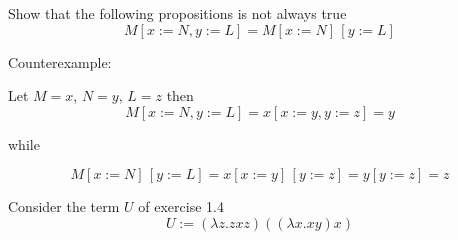 \documentclass[12pt]{exam}
\begin{document}
\begin{questions}

	\question
		Show that the following propositions is not always true
		\[M[ x:=N, y:=L] = M[ x:=N]\,[ y:=L]\]
		
		\begin{solution}
		
		Counterexample:
		
		Let $M=x$, $N=y$, $L=z$ then
		\[M[ x:=N, y:=L] = x[ x:=y, y:=z] = y\]
		
		while 
		
		\[M[ x:=N]\,[ y:=L] = x[ x:=y]\,[y:=z] = y[y:=z] = z\]
		\end{solution}

	\question
		Consider the term $U$ of exercise 1.4 
		\[U := (\lambda z. zxz) ((\lambda x. xy)x)\]
		\begin{solution}
\end{solution}
\end{questions}
\end{document}
